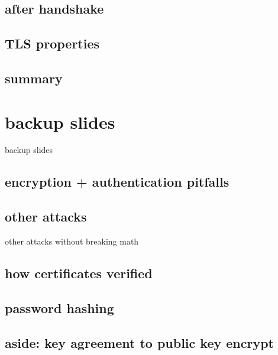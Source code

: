 \subsection{after handshake}


\subsection{TLS properties}




\subsection{summary}


\section{backup slides}
\begin{frame}{backup slides}
\end{frame}

\subsection{encryption + authentication pitfalls}



\subsection{other attacks}
\begin{frame}{other attacks without breaking math}
\end{frame}



\subsection{how certificates verified}


\subsection{password hashing}


\subsection{aside: key agreement to public key encrypt}


